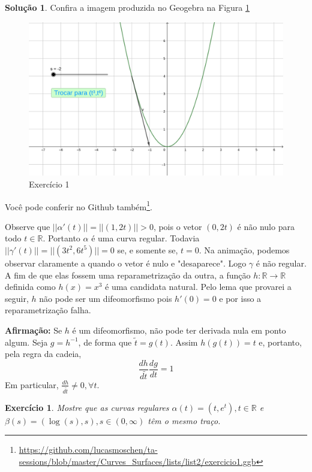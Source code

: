 \documentclass[a4paper,12pt]{article}
\newcommand{\R}{\mathbb{R}}
\theoremstyle{exer}
\newtheorem{exercise}{Exercício}
\theoremstyle{definition}
\newtheorem{solution}{Solução}
\theoremstyle{plain}
\begin{document}
\begin{solution}
    Confira a imagem produzida no Geogebra na Figura \ref{fig1}
    \begin{figure}[hb]
        \centering
        \includegraphics[width=\textwidth]{images/exe1.png}
        \caption{Exercício 1}
        \label{fig1}
    \end{figure}
    Você pode conferir no Github
    também\footnote{\url{https://github.com/lucasmoschen/ta-sessions/blob/master/Curves_Surfaces/lists/list2/exercicio1.ggb}}.
    
    Observe que $||\alpha'(t)|| = ||(1,2t)|| > 0$, pois o vetor $(0,2t)$ é não
    nulo para todo $t \in \R$. Portanto $\alpha$ é uma curva regular. Todavia
    $||\gamma'(t)|| = ||(3t^2, 6t^5)|| = 0$ se, e somente se, $t = 0$. Na
    animação, podemos observar claramente a quando o vetor é nulo e
    "desaparece". Logo $\gamma$ é não regular. A fim de que elas fossem uma
    reparametrização da outra, a função $h:\R \to \R$ definida como $h(x) =
    x^3$ é uma candidata natural. Pelo lema que provarei a seguir, $h$ não
    pode ser um difeomorfismo pois $h'(0) = 0$ e por isso a reparametrização falha. 

    {\bf Afirmação:} Se $h$ é um difeomorfismo, não pode ter derivada nula em
    ponto algum. Seja $g = h^{-1}$, de forma
    que $\tilde{t} = g(t)$. Assim $h(g(t)) = t$ e, portanto, pela regra da
    cadeia, 
    $$
    \frac{dh}{d \tilde{t}} \frac{dg}{dt} = 1
    $$
    Em particular, $\frac{dh}{d\tilde{t}} \neq 0, \forall t$. 
\end{solution}

\begin{exercise}
    Mostre que as curvas regulares $\alpha(t) = (t, e^t), t \in \R $ e
    $\beta(s) = (\log(s), s), s \in (0,\infty)$ têm o mesmo traço.
\end{exercise}
\end{document}
